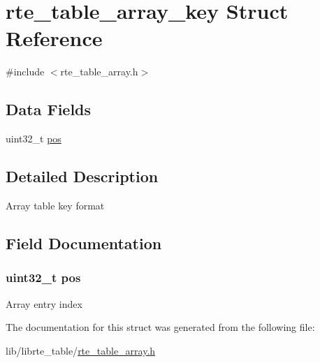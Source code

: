 \hypertarget{structrte__table__array__key}{}\section{rte\+\_\+table\+\_\+array\+\_\+key Struct Reference}
\label{structrte__table__array__key}


{\ttfamily \#include $<$rte\+\_\+table\+\_\+array.\+h$>$}

\subsection*{Data Fields}
\begin{DoxyCompactItemize}
\item 
uint32\+\_\+t \hyperlink{structrte__table__array__key_af09611129dedc89382e4d7b6427bdb27}{pos}
\end{DoxyCompactItemize}


\subsection{Detailed Description}
Array table key format 

\subsection{Field Documentation}
\hypertarget{structrte__table__array__key_af09611129dedc89382e4d7b6427bdb27}{}
\subsubsection[{pos}]{\setlength{\rightskip}{0pt plus 5cm}uint32\+\_\+t pos}\label{structrte__table__array__key_af09611129dedc89382e4d7b6427bdb27}
Array entry index 

The documentation for this struct was generated from the following file\+:\begin{DoxyCompactItemize}
\item 
lib/librte\+\_\+table/\hyperlink{rte__table__array_8h}{rte\+\_\+table\+\_\+array.\+h}\end{DoxyCompactItemize}
